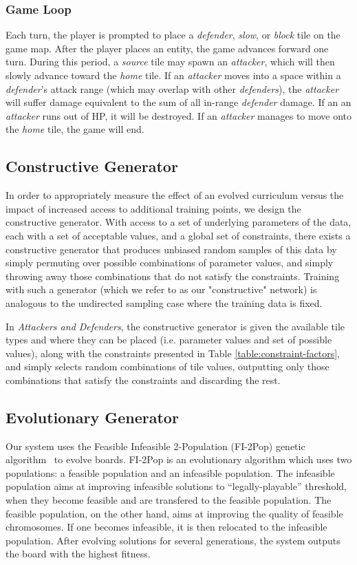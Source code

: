 \documentclass[letterpaper]{article} %
\begin{document}
\subsubsection{Game Loop}\label{sec:case-game-loop}
Each turn, the player is prompted to place a \textit{defender}, \textit{slow}, or \textit{block} tile on the game map.  After the player places an entity, the game advances forward one turn. During this period, a \textit{source} tile may spawn an \textit{attacker}, which will then slowly advance toward the \textit{home} tile. If an \textit{attacker} moves into a space within a \textit{defender}'s attack range (which may overlap with other \textit{defenders}), the \textit{attacker} will suffer damage equivalent to the sum of all in-range \textit{defender} damage. If an an \textit{attacker} runs out of HP, it will be destroyed. If an \textit{attacker} manages to move onto the \textit{home} tile, the game will end.

\subsection{Constructive Generator}\label{sec:case-constructive-generator}
In order to appropriately measure the effect of an evolved curriculum versus the impact of increased access to additional training points, we design the constructive generator. With access to a set of underlying parameters of the data, each with a set of acceptable values, and a global set of constraints, there exists a constructive generator that produces unbiased random samples of this data by simply permuting over possible combinations of parameter values, and simply throwing away those combinations that do not satisfy the constraints. Training with such a generator (which we refer to as our "constructive" network) is analogous to the undirected sampling case where the training data is fixed.

In \textit{Attackers and Defenders}, the constructive generator is given the available tile types and where they can be placed (i.e. parameter values and set of possible values), along with the constraints presented in Table \ref{table:constraint-factors}, and simply selects random combinations of tile values, outputting only those combinations that satisfy the constraints and discarding the rest.

\subsection{Evolutionary Generator}\label{sec:case-generator}
Our system uses the Feasible Infeasible 2-Population (FI-2Pop) genetic algorithm~\cite{kimbrough2008feasible} to evolve boards. FI-2Pop is an evolutionary algorithm which uses two populations: a feasible population and an infeasible population. The infeasible population aims at improving infeasible solutions to ``legally-playable'' threshold, when they become feasible and are transfered to the feasible population. The feasible population, on the other hand, aims at improving the quality of feasible chromosomes. If one becomes infeasible, it is then relocated to the infeasible population. After evolving solutions for several generations, the system outputs the board with the highest fitness.
\end{document}
